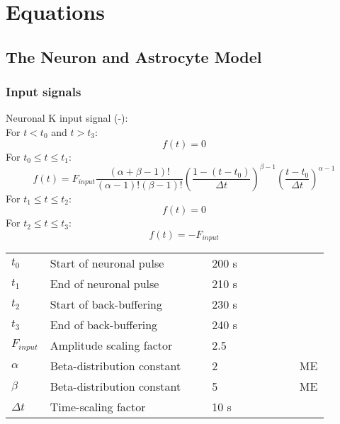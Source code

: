 
\section{Equations}\label{sec:equations}

\subsection{The Neuron and Astrocyte Model}

\subsubsection*{Input signals} \label{sec:InputSignal}

Neuronal \gls{K} input signal (-):\\
\vspace{0.25cm}
%
For $ t<t_0$ and $t>t_3$:
\begin{equation}
f(t)=0
\end{equation}
%
For $ t_0 \leq t \leq t_1$:
\begin{equation}
f(t)=F_{input} \dfrac{(\alpha+\beta-1)!}{(\alpha-1)!(\beta-1)!} \left( \dfrac{1-(t-t_0)}{\Delta t}\right) ^{\beta -1} \left( \dfrac{t-t_0}{\Delta t}\right) ^{\alpha -1} 
\end{equation}
%
For $ t_1 \leq t \leq t_2$:
\begin{equation}
f(t)=0
\end{equation}
%
For $ t_2 \leq t \leq t_3$:
\begin{equation}
f(t)=-F_{input}
\end{equation}
%
\begin{table}[h!]
\centering
\begin{tabular}{ p{0.09\linewidth}  >{\footnotesize} p{0.5\linewidth}  >{\footnotesize} p{0.27\linewidth} >{\footnotesize} p{0.03\linewidth} }
\hline
$t_0$ 			& Start of neuronal pulse	& 200 s &    \\
$t_1$ 			& End of neuronal pulse	& 210 s &   \\
$t_2$ 			& Start of back-buffering	& 230 s &    \\
$t_3$ 			& End of back-buffering	& 240 s &    \\
$F_{input}$ 	& Amplitude scaling factor 	& 2.5 	&    \\
$\alpha$ 		& Beta-distribution constant	& 2 	&  ME\footnotemark \\
$\beta$ 		& Beta-distribution constant	& 5 	&  ME  \\
$\Delta t$ 		& Time-scaling factor	& 10 s	&    \\
\hline
\end{tabular}
\end{table}
% 
